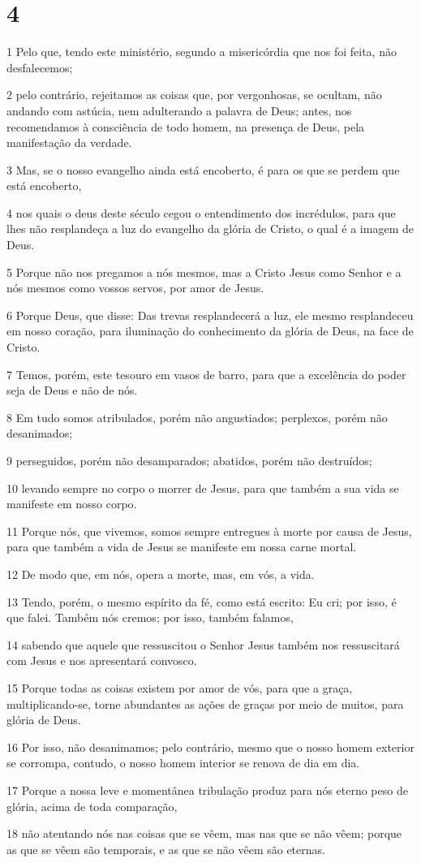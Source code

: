 \chapter{4}

\par 1 Pelo que, tendo este ministério, segundo a misericórdia que nos foi feita, não desfalecemos;
\par 2 pelo contrário, rejeitamos as coisas que, por vergonhosas, se ocultam, não andando com astúcia, nem adulterando a palavra de Deus; antes, nos recomendamos à consciência de todo homem, na presença de Deus, pela manifestação da verdade.
\par 3 Mas, se o nosso evangelho ainda está encoberto, é para os que se perdem que está encoberto,
\par 4 nos quais o deus deste século cegou o entendimento dos incrédulos, para que lhes não resplandeça a luz do evangelho da glória de Cristo, o qual é a imagem de Deus.
\par 5 Porque não nos pregamos a nós mesmos, mas a Cristo Jesus como Senhor e a nós mesmos como vossos servos, por amor de Jesus.
\par 6 Porque Deus, que disse: Das trevas resplandecerá a luz, ele mesmo resplandeceu em nosso coração, para iluminação do conhecimento da glória de Deus, na face de Cristo.
\par 7 Temos, porém, este tesouro em vasos de barro, para que a excelência do poder seja de Deus e não de nós.
\par 8 Em tudo somos atribulados, porém não angustiados; perplexos, porém não desanimados;
\par 9 perseguidos, porém não desamparados; abatidos, porém não destruídos;
\par 10 levando sempre no corpo o morrer de Jesus, para que também a sua vida se manifeste em nosso corpo.
\par 11 Porque nós, que vivemos, somos sempre entregues à morte por causa de Jesus, para que também a vida de Jesus se manifeste em nossa carne mortal.
\par 12 De modo que, em nós, opera a morte, mas, em vós, a vida.
\par 13 Tendo, porém, o mesmo espírito da fé, como está escrito: Eu cri; por isso, é que falei. Também nós cremos; por isso, também falamos,
\par 14 sabendo que aquele que ressuscitou o Senhor Jesus também nos ressuscitará com Jesus e nos apresentará convosco.
\par 15 Porque todas as coisas existem por amor de vós, para que a graça, multiplicando-se, torne abundantes as ações de graças por meio de muitos, para glória de Deus.
\par 16 Por isso, não desanimamos; pelo contrário, mesmo que o nosso homem exterior se corrompa, contudo, o nosso homem interior se renova de dia em dia.
\par 17 Porque a nossa leve e momentânea tribulação produz para nós eterno peso de glória, acima de toda comparação,
\par 18 não atentando nós nas coisas que se vêem, mas nas que se não vêem; porque as que se vêem são temporais, e as que se não vêem são eternas.


